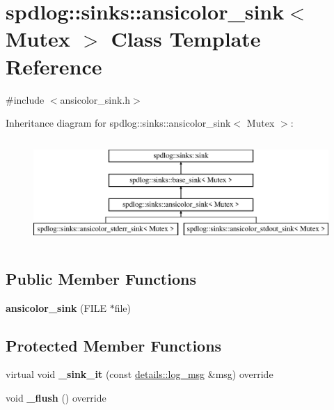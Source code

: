 \hypertarget{classspdlog_1_1sinks_1_1ansicolor__sink}{}\section{spdlog\+:\+:sinks\+:\+:ansicolor\+\_\+sink$<$ Mutex $>$ Class Template Reference}
\label{classspdlog_1_1sinks_1_1ansicolor__sink}


{\ttfamily \#include $<$ansicolor\+\_\+sink.\+h$>$}

Inheritance diagram for spdlog\+:\+:sinks\+:\+:ansicolor\+\_\+sink$<$ Mutex $>$\+:\begin{figure}[H]
\begin{center}
\leavevmode
\includegraphics[height=4.000000cm]{classspdlog_1_1sinks_1_1ansicolor__sink}
\end{center}
\end{figure}
\subsection*{Public Member Functions}
\begin{DoxyCompactItemize}
\item 
{\bfseries ansicolor\+\_\+sink} (F\+I\+LE $\ast$file)\hypertarget{classspdlog_1_1sinks_1_1ansicolor__sink_af8bcfa424c86b13aa996724bc0a16e70}{}\label{classspdlog_1_1sinks_1_1ansicolor__sink_af8bcfa424c86b13aa996724bc0a16e70}

\end{DoxyCompactItemize}
\subsection*{Protected Member Functions}
\begin{DoxyCompactItemize}
\item 
virtual void {\bfseries \+\_\+sink\+\_\+it} (const \hyperlink{structspdlog_1_1details_1_1log__msg}{details\+::log\+\_\+msg} \&msg) override\hypertarget{classspdlog_1_1sinks_1_1ansicolor__sink_acda6ffd87c39e2828bc6af700d37b0f3}{}\label{classspdlog_1_1sinks_1_1ansicolor__sink_acda6ffd87c39e2828bc6af700d37b0f3}

\item 
void {\bfseries \+\_\+flush} () override\hypertarget{classspdlog_1_1sinks_1_1ansicolor__sink_a0e933cdbf08223904d80fde32f28d569}{}\label{classspdlog_1_1sinks_1_1ansicolor__sink_a0e933cdbf08223904d80fde32f28d569}

\end{DoxyCompactItemize}
